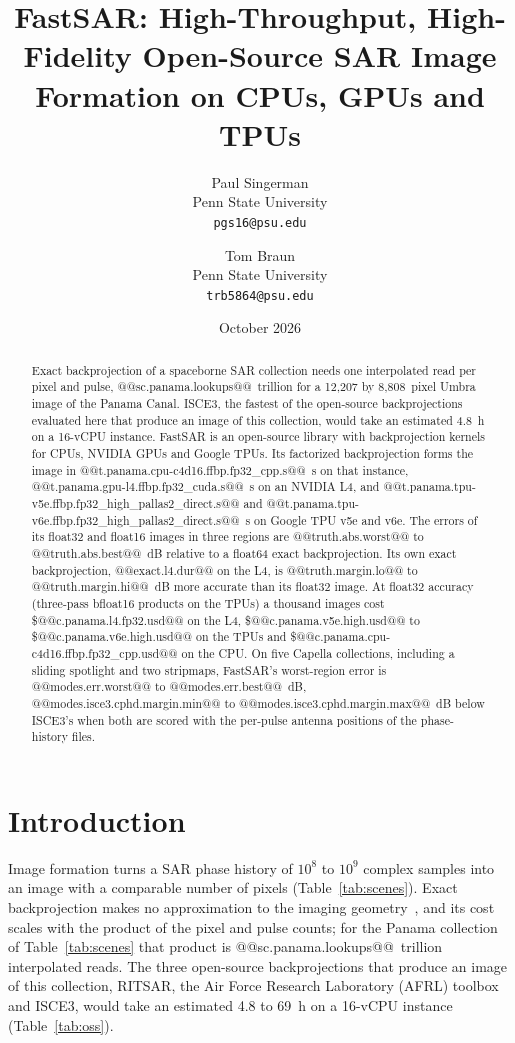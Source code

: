 \documentclass[11pt]{article}
\title{FastSAR: High-Throughput, High-Fidelity Open-Source SAR Image Formation on CPUs, GPUs and TPUs}
\author{Paul Singerman\\ Penn State University\\ \texttt{pgs16@psu.edu} \and Tom Braun\\ Penn State University\\ \texttt{trb5864@psu.edu}}
\date{October 2026}
\begin{document}
\maketitle

\begin{abstract}
Exact backprojection of a spaceborne SAR collection needs one interpolated read per pixel and pulse, @@sc.panama.lookups@@~trillion for a 12,207 by 8,808~pixel Umbra image of the Panama Canal. ISCE3, the fastest of the open-source backprojections evaluated here that produce an image of this collection, would take an estimated 4.8~h on a 16-vCPU instance. FastSAR is an open-source library with backprojection kernels for CPUs, NVIDIA GPUs and Google TPUs. Its factorized backprojection forms the image in @@t.panama.cpu-c4d16.ffbp.fp32_cpp.s@@~s on that instance, @@t.panama.gpu-l4.ffbp.fp32_cuda.s@@~s on an NVIDIA L4, and @@t.panama.tpu-v5e.ffbp.fp32_high_pallas2_direct.s@@ and @@t.panama.tpu-v6e.ffbp.fp32_high_pallas2_direct.s@@~s on Google TPU v5e and v6e. The errors of its float32 and float16 images in three regions are @@truth.abs.worst@@ to @@truth.abs.best@@~dB relative to a float64 exact backprojection. Its own exact backprojection, @@exact.l4.dur@@ on the L4, is @@truth.margin.lo@@ to @@truth.margin.hi@@~dB more accurate than its float32 image. At float32 accuracy (three-pass bfloat16 products on the TPUs) a thousand images cost \$@@c.panama.l4.fp32.usd@@ on the L4, \$@@c.panama.v5e.high.usd@@ to \$@@c.panama.v6e.high.usd@@ on the TPUs and \$@@c.panama.cpu-c4d16.ffbp.fp32_cpp.usd@@ on the CPU. On five Capella collections, including a sliding spotlight and two stripmaps, FastSAR's worst-region error is @@modes.err.worst@@ to @@modes.err.best@@~dB, @@modes.isce3.cphd.margin.min@@ to @@modes.isce3.cphd.margin.max@@~dB below ISCE3's when both are scored with the per-pulse antenna positions of the phase-history files.
\end{abstract}

\section{Introduction}

Image formation turns a SAR phase history of $10^8$ to $10^9$ complex samples into an image with a comparable number of pixels (Table~\ref{tab:scenes}). Exact backprojection makes no approximation to the imaging geometry~\cite{jakowatz1996,gorham2010}, and its cost scales with the product of the pixel and pulse counts; for the Panama collection of Table~\ref{tab:scenes} that product is @@sc.panama.lookups@@~trillion interpolated reads. The three open-source backprojections that produce an image of this collection, RITSAR, the Air Force Research Laboratory (AFRL) toolbox and ISCE3, would take an estimated 4.8 to 69~h on a 16-vCPU instance (Table~\ref{tab:oss}).
\end{document}
